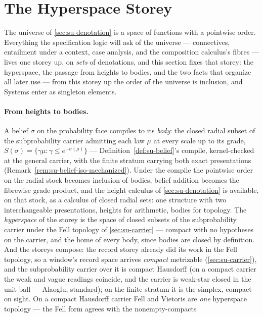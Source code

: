 \section{The Hyperspace Storey}
\label{sec:su-hyperspace}

The universe of \autoref{sec:su-denotation} is a space of
functions with a pointwise order. Everything the specification
logic will ask of the universe --- connectives, entailment under a
context, case analysis, and the composition calculus's fibres ---
lives one storey up, on \emph{sets} of denotations, and this
section fixes that storey: the hyperspace, the passage from heights
to bodies, and the two facts that organize all later use --- from
this storey up the order of the universe is inclusion, and Systems
enter as singleton elements.

\paragraph{From heights to bodies.} A belief $\sigma$ on the
probability face compiles to its \emph{body}: the closed radial
subset of the subprobability carrier admitting each law $\mu$ at
every scale up to its grade,
$S(\sigma) = \{\gamma\mu : \gamma \le e^{-\sigma(\mu)}\}$ ---
Definition~\ref{def:su-belief}'s compile, kernel-checked
at the general carrier, with the finite stratum carrying both exact
presentations
(Remark~\ref{rem:su-belief-iso-mechanized}). Under the compile the
pointwise order on the radial stock becomes inclusion of bodies,
belief addition becomes the fibrewise grade product, and the height
calculus of \autoref{sec:su-denotation} is available, on that
stock, as a calculus of closed radial sets: one structure with two
interchangeable presentations, heights for arithmetic, bodies for
topology. The
\emph{hyperspace} of the storey is the space of closed subsets of
the subprobability carrier under the Fell topology of
\autoref{sec:su-carrier} --- compact with no hypotheses on the
carrier, and the home of every body, since bodies are closed by
definition. And the storeys compose: the record storey already did
its work in the Fell topology, so a window's record space arrives
\emph{compact} metrizable (\autoref{sec:su-carrier}), and the
subprobability carrier over it is compact Hausdorff (on a compact
carrier the weak and vague readings coincide, and the carrier is
weak-star closed in the unit ball --- Alaoglu, standard); on the
finite stratum it is the simplex, compact on sight. On a compact
Hausdorff carrier Fell and Vietoris are \emph{one} hyperspace
topology --- the Fell form agrees with the nonempty-compacts
